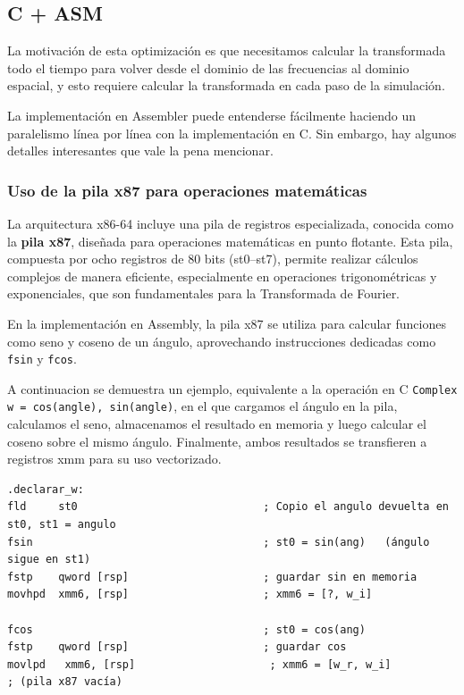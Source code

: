 \documentclass[a4paper]{article}
\begin{document}
\subsection{C + ASM}

La motivación de esta optimización es que necesitamos calcular la transformada todo el tiempo para volver desde el dominio de las frecuencias al dominio espacial, y esto requiere calcular la transformada en cada paso de la simulación.

La implementación en Assembler puede entenderse fácilmente haciendo un paralelismo línea por línea con la implementación en C. Sin embargo, hay algunos detalles interesantes que vale la pena mencionar.

\subsubsection{Uso de la pila x87 para operaciones matemáticas}
La arquitectura x86-64 incluye una pila de registros especializada, conocida como la \textbf{pila x87}, diseñada para operaciones matemáticas en punto flotante.
Esta pila, compuesta por ocho registros de 80 bits (st0--st7), permite realizar cálculos complejos de manera eficiente, especialmente en operaciones trigonométricas
y exponenciales, que son fundamentales para la Transformada de Fourier.

En la implementación en Assembly, la pila x87 se utiliza para calcular funciones como seno y coseno de un ángulo, aprovechando instrucciones dedicadas como
\texttt{fsin} y \texttt{fcos}.

A continuacion se demuestra un ejemplo, equivalente a la operación en C \texttt{Complex w = {cos(angle), sin(angle)}}, en el que cargamos el ángulo en la pila, calculamos el seno, almacenamos el resultado en memoria y luego calcular el coseno sobre el mismo ángulo. Finalmente, ambos resultados se transfieren a registros xmm para su uso vectorizado.

\begin{verbatim}
.declarar_w:
fld     st0                             ; Copio el angulo devuelta en st0, st1 = angulo
fsin                                    ; st0 = sin(ang)   (ángulo sigue en st1)
fstp    qword [rsp]                     ; guardar sin en memoria
movhpd  xmm6, [rsp]                     ; xmm6 = [?, w_i]

fcos                                    ; st0 = cos(ang)
fstp    qword [rsp]                     ; guardar cos
movlpd   xmm6, [rsp]                     ; xmm6 = [w_r, w_i]
; (pila x87 vacía)
\end{verbatim}
\end{document}
